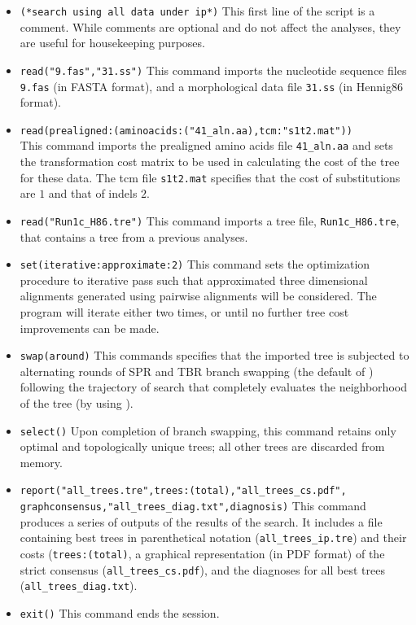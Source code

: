 \begin{itemize}
\item \texttt{(*search using all data under ip*)} This first line
of the script is a comment. While comments are optional and do not
affect the analyses, they are useful for housekeeping purposes.
\item \texttt{read("9.fas","31.ss")} This command imports the
nucleotide sequence files \texttt{9.fas} (in FASTA format), and a
morphological data file \texttt{31.ss} (in Hennig86 format).  
\item \texttt{read(prealigned:(aminoacids:("41\_aln.aa),tcm:"s1t2.mat"))}\\
This command imports the prealigned amino acids file \texttt{41\_aln.aa}
and sets the transformation cost matrix to be used in calculating
the cost of the tree for these data.  The tcm file \texttt{s1t2.mat}
specifies that the cost of substitutions are $1$ and that of indels
$2$.  
\item \texttt{read("Run1c\_H86.tre")} This command imports a
tree file, \texttt{Run1c\_H86.tre}, that contains a 
tree from a previous analyses.  
\item \texttt{set(iterative:approximate:2)}
This command sets the optimization procedure to iterative pass such
that approximated three dimensional alignments generated using
pairwise alignments will be considered.  The program will iterate
either two times, or until no further tree cost improvements can
be made.  
\item \texttt{swap(around)} This commands specifies that
the imported tree is subjected to alternating rounds of SPR and TBR
branch swapping (the default of \poy) following the trajectory of
search that completely evaluates the neighborhood of the tree (by
using ).  
\item \texttt{select()} Upon completion
of branch swapping, this command retains only optimal and topologically
unique trees; all other trees are discarded from memory.  
\item \texttt{report("all\_trees.tre",trees:(total),"all\_trees\_cs.pdf",\\
graphconsensus,"all\_trees\_diag.txt",diagnosis)}
This command produces a series of outputs of the results of the
search. It includes a file containing best trees in parenthetical
notation (\texttt{all\_trees\_ip.tre}) and their costs
(\texttt{trees:(total)}, a graphical representation (in PDF format)
of the strict consensus (\texttt{all\_trees\_cs.pdf}), and the
diagnoses for all best trees (\texttt{all\_trees\_diag.txt}).  
\item \texttt{exit()} This command ends the \poy session.

\end{itemize}

